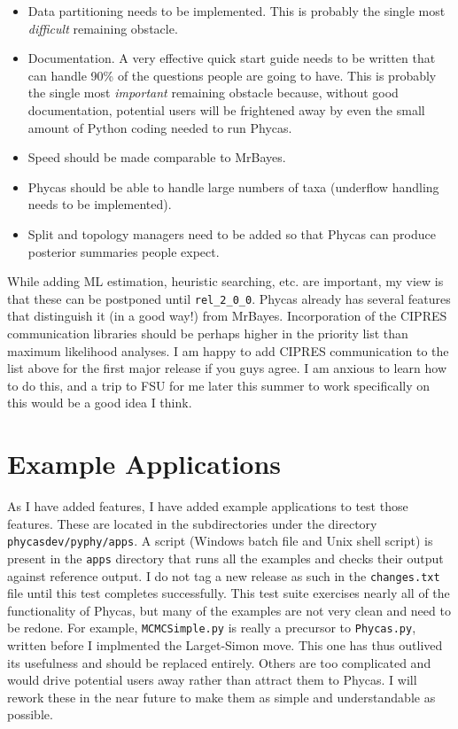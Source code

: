\documentclass[10pt]{article}
\begin{document}
\begin{itemize}
\item Data partitioning needs to be implemented. This is probably the single most {\em difficult} remaining obstacle.
\item Documentation. A very effective quick start guide needs to be written that can handle 90\% of the questions people are going to have. This is probably the single most {\em important} remaining obstacle because, without good documentation, potential users will be frightened away by even the small amount of Python coding needed to run Phycas.
\item Speed should be made comparable to MrBayes.
\item Phycas should be able to handle large numbers of taxa (underflow handling needs to be implemented).
\item Split and topology managers need to be added so that Phycas can produce posterior summaries people expect.
\end{itemize}

While adding ML estimation, heuristic searching, etc. are important, my view is that these can be postponed until \verb+rel_2_0_0+. Phycas already has several features that distinguish it (in a good way!) from MrBayes. Incorporation of the CIPRES communication libraries should be perhaps higher in the priority list than maximum likelihood analyses. I am happy to add CIPRES communication to the list above for the first major release if you guys agree. I am anxious to learn how to do this, and a trip to FSU for me later this summer to work specifically on this would be a good idea I think.

\section{Example Applications}

As I have added features, I have added example applications to test those features. These are located in the subdirectories under the directory {\tt phycasdev/pyphy/apps}. A script (Windows batch file and Unix shell script) is present in the {\tt apps} directory that runs all the examples and checks their output against reference output. I do not tag a new release as such in the {\tt changes.txt} file until this test completes successfully. This test suite exercises nearly all of the functionality of Phycas, but many of the examples are not very clean and need to be redone. For example, {\tt MCMCSimple.py} is really a precursor to {\tt Phycas.py}, written before I implmented the Larget-Simon move. This one has thus outlived its usefulness and should be replaced entirely. Others are too complicated and would drive potential users away rather than attract them to Phycas. I will rework these in the near future to make them as simple and understandable as possible.
\end{document}
